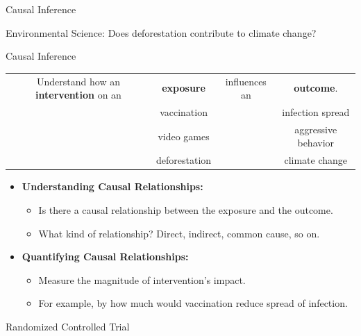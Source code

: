 \documentclass[aspectratio=169]{beamer}
\begin{document}
\begin{frame}{Causal Inference}
{\begin{figure}
\begin{subfigure}{0.35 \textwidth}
		\end{subfigure}
	\end{figure}
	\vspace{1em}
	Environmental Science: Does deforestation contribute to climate change?
	}
\end{frame}

\begin{frame}{Causal Inference}
	\begin{tabular}{cccc}
		Understand how an \textbf{intervention} on an & \textbf{exposure} & influences an & \textbf{outcome}. \\
							      & vaccination & & infection spread \\
							      & video games & & aggressive behavior \\
							      & deforestation & & climate change \\
	\end{tabular}
	\vspace{2em}

	\begin{itemize}
		\item \textbf{Understanding Causal Relationships: }
			\begin{itemize}
				\item Is there a causal relationship between the exposure and the outcome.
				\item What kind of relationship? Direct, indirect, common cause, so on.
			\end{itemize}
		\item \textbf{Quantifying Causal Relationships: }
			\begin{itemize}
				\item Measure the magnitude of intervention's impact.
				\item For example, by how much would vaccination reduce spread of infection.
			\end{itemize}
	\end{itemize}
\end{frame}

\begin{frame}{Randomized Controlled Trial}	
\end{frame}
\end{document}
